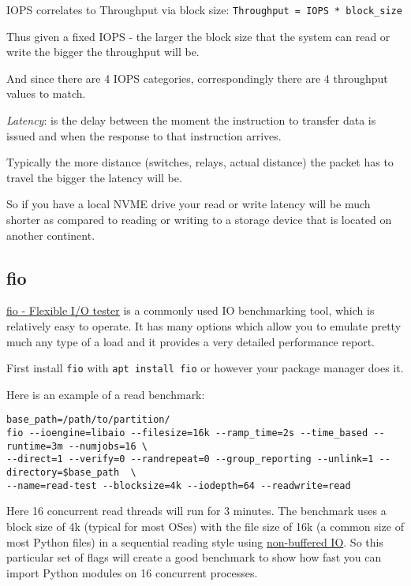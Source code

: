 \documentclass[
]{report}
\begin{document}
IOPS correlates to Throughput via block size:
\texttt{Throughput\ =\ IOPS\ *\ block\_size}

Thus given a fixed IOPS - the larger the block size that the system can
read or write the bigger the throughput will be.

And since there are 4 IOPS categories, correspondingly there are 4
throughput values to match.

\emph{Latency}: is the delay between the moment the instruction to
transfer data is issued and when the response to that instruction
arrives.

Typically the more distance (switches, relays, actual distance) the
packet has to travel the bigger the latency will be.

So if you have a local NVME drive your read or write latency will be
much shorter as compared to reading or writing to a storage device that
is located on another continent.

\subsection{fio}\label{fio}

\href{https://fio.readthedocs.io/en/latest/}{fio - Flexible I/O tester}
is a commonly used IO benchmarking tool, which is relatively easy to
operate. It has many options which allow you to emulate pretty much any
type of a load and it provides a very detailed performance report.

First install \texttt{fio} with \texttt{apt\ install\ fio} or however
your package manager does it.

Here is an example of a read benchmark:

\begin{verbatim}
base_path=/path/to/partition/
fio --ioengine=libaio --filesize=16k --ramp_time=2s --time_based --runtime=3m --numjobs=16 \
--direct=1 --verify=0 --randrepeat=0 --group_reporting --unlink=1 --directory=$base_path  \
--name=read-test --blocksize=4k --iodepth=64 --readwrite=read
\end{verbatim}

Here 16 concurrent read threads will run for 3 minutes. The benchmark
uses a block size of 4k (typical for most OSes) with the file size of
16k (a common size of most Python files) in a sequential reading style
using \hyperref[direct-vs-buffered-io]{non-buffered IO}. So this
particular set of flags will create a good benchmark to show how fast
you can import Python modules on 16 concurrent processes.
\end{document}
